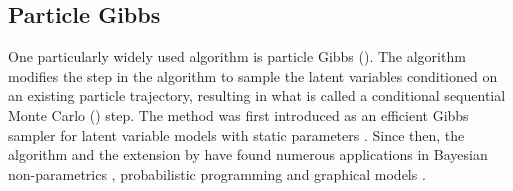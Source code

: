 \subsection{Particle Gibbs}
\label{sec:part:pmcmc:pgibbs}

One particularly widely used \pmcmc algorithm is particle Gibbs (\pg). The \pg algorithm modifies the 
\smc step in the \pmcmc algorithm to sample the latent variables conditioned on an existing particle
 trajectory, resulting in what is called a conditional sequential Monte Carlo (\csmc) step. The \pg method
  was first introduced as an efficient Gibbs sampler for latent variable models with static parameters 
  \citep{andrieuDH2010}. Since then, the \pg algorithm and the extension by \citet{lindstenJS2014} have 
  found numerous applications in \eg Bayesian non-parametrics \citep{ValeraFSPC2015,tripuraneni2015}, 
  probabilistic programming \citep{wood2014new,vandemeent_aistats_2015} and graphical models 
  \citep{everitt2012,naessethLS2014,naessethLS2015nested}.  

